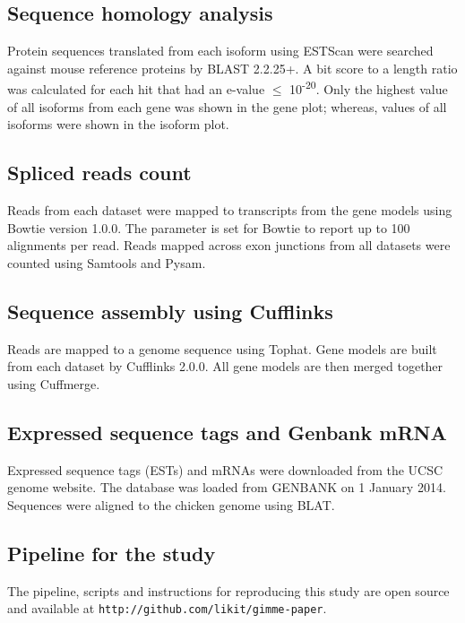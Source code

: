 \documentclass[10pt]{article}
\begin{document}

\subsection*{Sequence homology analysis}

Protein sequences translated from each isoform using ESTScan were searched
against mouse reference proteins by BLAST 2.2.25+\cite{Tatusova:1999tz}.  A bit
score to a length ratio was calculated for each hit that had an e-value $\le$
10\textsuperscript{-20}.  Only the highest value of all isoforms from each gene
was shown in the gene plot; whereas, values of all isoforms were shown in the
isoform plot.

\subsection*{Spliced reads count}

Reads from each dataset were mapped to transcripts from the gene models using
Bowtie version 1.0.0. The parameter is set for Bowtie to report up to 100
alignments per read.  Reads mapped across exon junctions from all datasets were
counted using Samtools\cite{li2009sequence} and Pysam\cite{pysam}.

\subsection*{Sequence assembly using Cufflinks}
Reads are mapped to a genome sequence using Tophat.  Gene models are built from
each dataset by Cufflinks 2.0.0\cite{Trapnell:2010kd}.  All gene models are
then merged together using Cuffmerge.

\subsection*{Expressed sequence tags and Genbank mRNA}
Expressed sequence tags (ESTs) and mRNAs were downloaded from the UCSC genome
website.  The database was loaded from GENBANK on 1 January 2014.  Sequences
were aligned to the chicken genome using BLAT.

\subsection*{Pipeline for the study}
The pipeline, scripts and instructions for reproducing this study are open
source and available at \texttt{http://github.com/likit/gimme-paper}.
\end{document}
